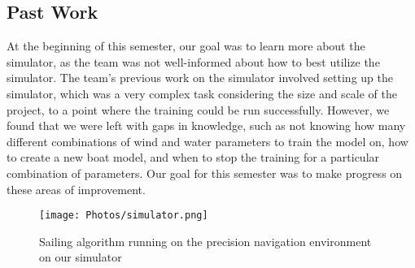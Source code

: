 \documentclass{article}
\begin{document}
\subsection{Past Work}
At the beginning of this semester, our goal was to learn more about the simulator, as the team was not well-informed about how to best utilize the simulator. The team's previous work on the simulator involved setting up the simulator, which was a very complex task considering the size and scale of the project, to a point where the training could be run successfully. However, we found that we were left with gaps in knowledge, such as not knowing how many different combinations of wind and water parameters to train the model on, how to create a new boat model, and when to stop the training for a particular combination of parameters. Our goal for this semester was to make progress on these areas of improvement. 
\begin{figure}[htp]
    \centering
    \texttt{[image: Photos/simulator.png]}
    \caption{Sailing algorithm running on the precision navigation environment on our simulator}
    \label{Photos/fig:simulator.png}
\end{figure}
\end{document}
